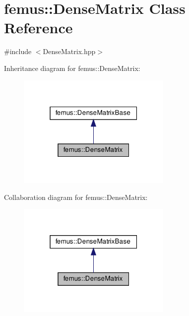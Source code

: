 \hypertarget{classfemus_1_1_dense_matrix}{}\section{femus\+:\+:Dense\+Matrix Class Reference}
\label{classfemus_1_1_dense_matrix}


{\ttfamily \#include $<$Dense\+Matrix.\+hpp$>$}



Inheritance diagram for femus\+:\+:Dense\+Matrix\+:
\nopagebreak
\begin{figure}[H]
\begin{center}
\leavevmode
\includegraphics[width=211pt]{classfemus_1_1_dense_matrix__inherit__graph}
\end{center}
\end{figure}


Collaboration diagram for femus\+:\+:Dense\+Matrix\+:
\nopagebreak
\begin{figure}[H]
\begin{center}
\leavevmode
\includegraphics[width=211pt]{classfemus_1_1_dense_matrix__coll__graph}
\end{center}
\end{figure}
